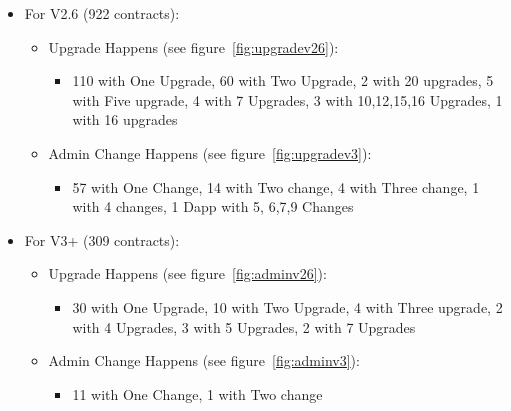 \begin{itemize}
  \item For V2.6 (922 contracts):
  \begin{itemize}
    \item Upgrade Happens (see figure~\ref{fig:upgradev26}):
    \begin{itemize}
      \item 110 with One Upgrade, 60 with Two Upgrade, 2 with 20 upgrades, 5 with Five upgrade, 4 with 7 Upgrades, 3 with 10,12,15,16 Upgrades, 1 with 16 upgrades
    \end{itemize}
    \item Admin Change Happens (see figure~\ref{fig:upgradev3}):
    \begin{itemize}
      \item 57 with One Change, 14 with Two change, 4 with Three change, 1 with 4 changes, 1 Dapp with 5, 6,7,9 Changes
    \end{itemize}
  \end{itemize}
  \item For V3+ (309 contracts):
  \begin{itemize}
    \item Upgrade Happens (see figure~\ref{fig:adminv26}):
    \begin{itemize}
      \item 30 with One Upgrade, 10 with Two Upgrade, 4 with Three upgrade, 2 with 4 Upgrades, 3 with 5 Upgrades, 2 with 7 Upgrades
    \end{itemize}
    \item Admin Change Happens (see figure~\ref{fig:adminv3}):
    \begin{itemize}
      \item 11 with One Change, 1 with Two change
    \end{itemize}
  \end{itemize}
\end{itemize}


